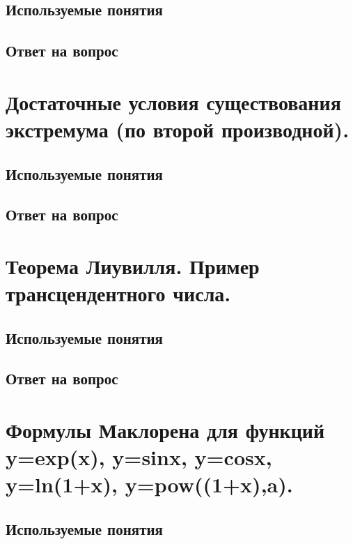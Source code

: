 \documentclass[12pt,a4paper]{article}
\begin{document}
\subsection{Используемые понятия}


\subsection{Ответ на вопрос}


\newpage
\section{Достаточные условия существования экстремума (по второй производной).}

\subsection{Используемые понятия}


\subsection{Ответ на вопрос}


\newpage
\section{Теорема Лиувилля. Пример трансцендентного числа.}

\subsection{Используемые понятия}


\subsection{Ответ на вопрос}


\newpage
\section{Формулы Маклорена для функций y=exp(x), y=sinx, y=cosx, y=ln(1+x), y=pow((1+x),a).}

\subsection{Используемые понятия}

\end{document}
